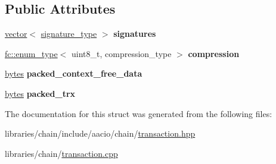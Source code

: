 \subsection*{Public Attributes}
\begin{DoxyCompactItemize}
\item 
\mbox{\label{structaacio_1_1chain_1_1packed__transaction_abf7e364139df109d77507e002a75e75f}} 
\mbox{\hyperlink{classstd_1_1vector}{vector}}$<$ \mbox{\hyperlink{classfc_1_1crypto_1_1signature}{signature\+\_\+type}} $>$ {\bfseries signatures}
\item 
\mbox{\label{structaacio_1_1chain_1_1packed__transaction_a6f835166905ca0075798b69eb4771b8f}} 
\mbox{\hyperlink{classfc_1_1enum__type}{fc\+::enum\+\_\+type}}$<$ uint8\+\_\+t, compression\+\_\+type $>$ {\bfseries compression}
\item 
\mbox{\label{structaacio_1_1chain_1_1packed__transaction_a83f4e62180c700cd18776e3ebb58488c}} 
\mbox{\hyperlink{classstd_1_1vector}{bytes}} {\bfseries packed\+\_\+context\+\_\+free\+\_\+data}
\item 
\mbox{\label{structaacio_1_1chain_1_1packed__transaction_a42931d98d66346a80ff4e792b2e9184b}} 
\mbox{\hyperlink{classstd_1_1vector}{bytes}} {\bfseries packed\+\_\+trx}
\end{DoxyCompactItemize}


The documentation for this struct was generated from the following files\+:\begin{DoxyCompactItemize}
\item 
libraries/chain/include/aacio/chain/\mbox{\hyperlink{libraries_2chain_2include_2aacio_2chain_2transaction_8hpp}{transaction.\+hpp}}\item 
libraries/chain/\mbox{\hyperlink{transaction_8cpp}{transaction.\+cpp}}\end{DoxyCompactItemize}
